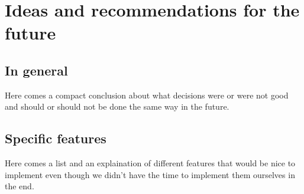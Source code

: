 \documentclass[main.tex]{subfiles}
\begin{document}
	\begingroup

	\renewcommand{\cleardoublepage}{}

	\renewcommand{\clearpage}{}

	\chapter{Ideas and recommendations for the future}

		\chapterauthor{}
		
		\section{In general}
		Here comes a compact conclusion about what decisions were or were not good and should or should not be done the same way in the future.
		
		\section{Specific features}
		Here comes a list and an explaination of different features that would be nice to implement even though we didn't have the time to implement them ourselves in the end.
	  	

	\endgroup
\end{document}
